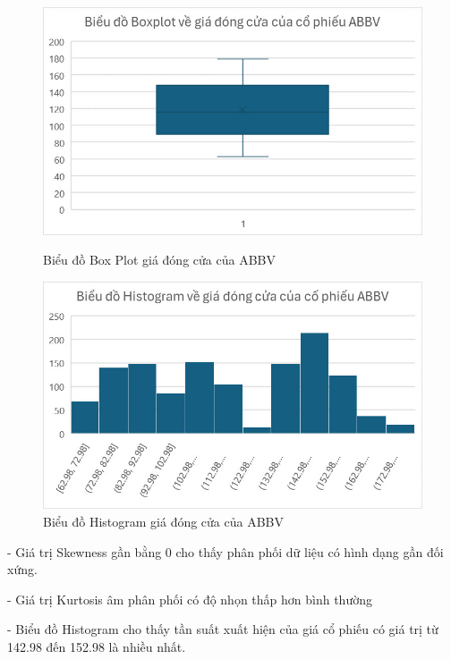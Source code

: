 \documentclass[conference]{IEEEtran}
\begin{document}
\begin{figure}[H]
    \centering
    \begin{minipage}{0.23\textwidth}
    \centering
    \includegraphics[width=1\textwidth]{Image/ABBV_Boxplot.jpg}
    \caption{Biểu đồ Box Plot giá đóng cửa của ABBV}
    \label{fig:1}
    \end{minipage}
    \hfill
    \begin{minipage}{0.23\textwidth}
    \centering
    \includegraphics[width=1\textwidth]{Image/ABBV_Histogram.jpg}
    \caption{Biểu đồ Histogram giá đóng cửa của ABBV}
    \label{fig:2}
    \end{minipage}
\end{figure}
- Giá trị Skewness gần bằng 0 cho thấy phân phối dữ liệu có hình dạng gần đối xứng.

- Giá trị Kurtosis âm phân phối có độ nhọn thấp hơn bình thường

- Biểu đồ Histogram cho thấy tần suất xuất hiện của giá cổ phiếu có giá trị từ 142.98 đến 152.98 là nhiều nhất.
\end{document}
